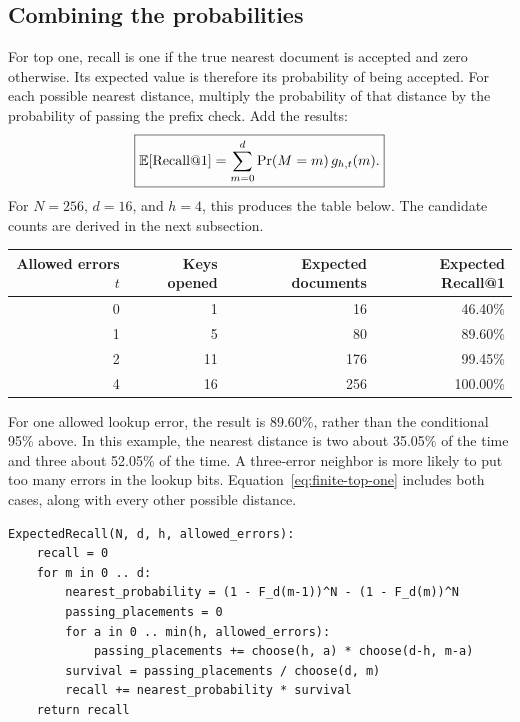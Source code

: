 \subsection{Combining the probabilities}
For top one, recall is one if the true nearest document is accepted and zero otherwise.
Its expected value is therefore its probability of being accepted. For each possible nearest
distance, multiply the probability of that distance by the probability of passing the prefix
check. Add the results:
\begin{equation}
\boxed{\mathbb E[\operatorname{Recall@1}]
=\sum_{m=0}^{d}\Pr(M=m)\,g_{h,t}(m).}
\label{eq:finite-top-one}
\end{equation}
For $N=256$, $d=16$, and $h=4$, this produces the table below. The candidate counts are derived
in the next subsection.

\begin{center}
\begin{tabular}{@{}rrrr@{}}
\toprule
Allowed errors $t$ & Keys opened & Expected documents & Expected Recall@1\\\midrule
0 & 1 & 16 & 46.40\%\\
1 & 5 & 80 & 89.60\%\\
2 & 11 & 176 & 99.45\%\\
4 & 16 & 256 & 100.00\%\\\bottomrule
\end{tabular}
\end{center}
For one allowed lookup error, the result is 89.60\%, rather than the conditional 95\% above.
In this example, the nearest distance is two about 35.05\% of the time and three about
52.05\% of the time. A three-error neighbor is more likely to put too many errors in the
lookup bits. Equation~\eqref{eq:finite-top-one} includes both cases, along with every other
possible distance.

\par\noindent\begin{minipage}{\linewidth}
\begin{lstlisting}[caption={Calculate expected top-one recall under the random-bit assumptions.}]
ExpectedRecall(N, d, h, allowed_errors):
    recall = 0
    for m in 0 .. d:
        nearest_probability = (1 - F_d(m-1))^N - (1 - F_d(m))^N
        passing_placements = 0
        for a in 0 .. min(h, allowed_errors):
            passing_placements += choose(h, a) * choose(d-h, m-a)
        survival = passing_placements / choose(d, m)
        recall += nearest_probability * survival
    return recall
\end{lstlisting}
\end{minipage}\par

